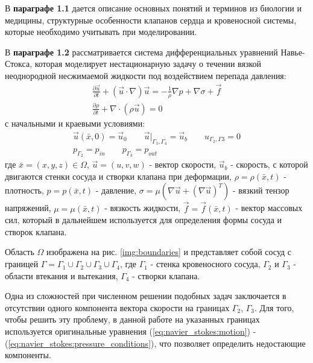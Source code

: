 В \textbf{параграфе 1.1} дается описание основных понятий и терминов из
биологии и медицины, структурные особенности клапанов сердца и кровеносной
системы, которые необходимо учитывать при моделировании.

В \textbf{параграфе 1.2} рассматривается система дифференциальных уравнений
Навье-Стокса, которая моделирует нестационарную задачу о течении вязкой
неоднородной несжимаемой жидкости под воздействием перепада давления:
\begin{gather}
    \label{eq:navier_stokes:motion}
    \frac{\partial \vec{u}}{\partial t} + (\vec{u} \cdot \nabla) \vec{u} = - \frac{1}{\rho} \nabla p + \nabla \sigma + \vec{f}\\
    \label{eq:navier_stokes:continuity}
    \frac{\partial \rho}{\partial t} + \nabla \cdot (\rho \vec{u}) = 0
\end{gather}
с начальными и краевыми условиями:
\begin{gather}
    \label{eq:navier_stokes:velocity_conditions}
    \vec{u}(\bar{x}, 0) = \vec{u}_0 \qquad \vec{u}|_{\Gamma_1, \Gamma_4} = \vec{u}_b \qquad u_{\Gamma_2, \Gamma3} = 0\\
    \label{eq:navier_stokes:pressure_conditions}
    p_{\Gamma_2} = p_{in} \qquad p_{\Gamma_3} = p_{out}
\end{gather}
где $\bar{x}=(x,y,z) \in \Omega$, $\vec{u}=(u,v,w)$ - вектор скорости,
$\vec{u}_b$ - скорость, с которой двигаются стенки сосуда и створки клапана при
деформации, $\rho=\rho(\bar{x}, t)$ - плотность, $p=p(\bar{x}, t)$ - давление,
$\sigma = \mu (\nabla \vec{u} + (\nabla \vec{u})^T)$ - вязкий тензор
напряжений, $\mu = \mu(\bar{x}, t)$ - вязкость жидкости, $\vec{f} =
\vec{f}(\bar{x}, t)$ - вектор массовых сил, который в дальнейшем используется
для определения формы сосуда и створок клапана.

Область $\Omega$ изображена на рис. \ref{img:boundaries} и представляет собой
сосуд с границей $\Gamma = \Gamma_1 \cup \Gamma_2 \cup \Gamma_3 \cup \Gamma_4$,
где $\Gamma_1$ - стенка кровеносного сосуда, $\Gamma_2$ и $\Gamma_3$ -  области
втекания и вытекания, $\Gamma_4$ - створки клапана.

Одна из сложностей при численном решении подобных задач заключается в
отсутствии одного компонента вектора скорости на границах $\Gamma_2$,
$\Gamma_3$. Для того, чтобы решить эту проблему, в данной работе на указанных
границах используется оригинальные уравнения (\ref{eq:navier_stokes:motion}) -
(\ref{eq:navier_stokes:pressure_conditions}), что позволяет определить
недостающие компоненты.

